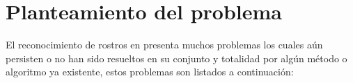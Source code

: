 

\section{Planteamiento del problema}

El reconocimiento de rostros en  presenta muchos problemas los cuales aún persisten o no han sido resueltos en su conjunto y totalidad por algún método o algoritmo ya existente, estos problemas son listados a continuación:

